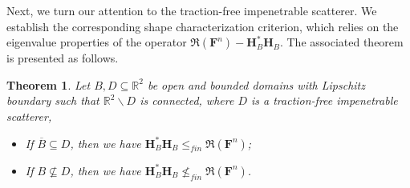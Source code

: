 \documentclass[11pt,reqno,twoside]{amsart}
\newtheorem{thm}{Theorem}[section]
\theoremstyle{definition}
\theoremstyle{remark}
\numberwithin{equation}{section}
\begin{document}
Next, we turn our attention to the traction-free impenetrable scatterer. We establish the corresponding shape characterization criterion, which relies on the eigenvalue properties of the operator \( \Re\left(\mathbf F^n \right)-\mathbf H^*_B\mathbf H_B \). The associated theorem is presented as follows.


\begin{thm}\label{Characterofimpenetrable scatterer2}
	Let $B,D\subseteq \mathbb R^{2}$ be open and bounded domains with Lipschitz boundary such that $\mathbb R^2\backslash D$ is connected, where $D$ is a traction-free impenetrable scatterer,
	\begin{itemize}
		\item [(1).] If $\overline{B}\subseteq D$, then we have $\mathbf H^*_B\mathbf H_B \leq_{fin} \Re\left( \mathbf F^n\right) $;
		\item [(2).] If $B\nsubseteq D$, then we have $\mathbf H^*_B\mathbf H_B \nleq_{fin} \Re\left( \mathbf F^n\right)$.
	\end{itemize} 
\end{thm}
\end{document}
